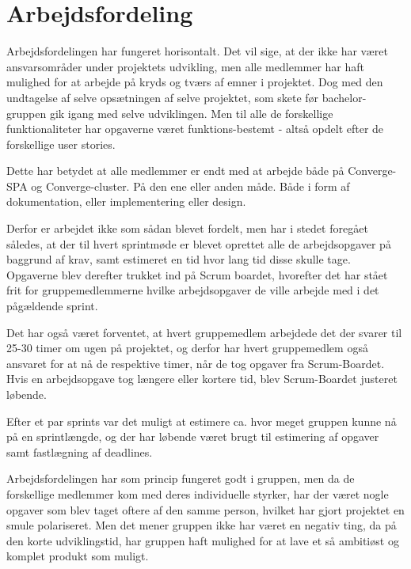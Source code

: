 
\chapter{Arbejdsfordeling}

Arbejdsfordelingen har fungeret horisontalt. Det vil sige, at der ikke har været ansvarsområder under projektets udvikling, men alle medlemmer har haft mulighed for at arbejde på kryds og tværs af emner i projektet. Dog med den undtagelse af selve opsætningen af selve projektet, som skete før bachelor-gruppen gik igang med selve udviklingen. Men til alle de forskellige funktionaliteter  har opgaverne været funktions-bestemt - altså opdelt efter de forskellige user stories.

Dette har betydet at alle medlemmer er endt med at arbejde både på Converge-SPA og Converge-cluster. På den ene eller anden måde. Både i form af dokumentation, eller implementering eller design.

Derfor er arbejdet ikke som sådan blevet fordelt, men har i stedet foregået således, at der til hvert sprintmøde er blevet oprettet alle de arbejdsopgaver på baggrund af krav, samt estimeret en tid hvor lang tid disse skulle tage. Opgaverne blev derefter trukket ind på Scrum boardet, hvorefter det har stået frit for gruppemedlemmerne hvilke arbejdsopgaver de ville arbejde med i det pågældende sprint.

Det har også været forventet, at hvert gruppemedlem arbejdede det der svarer til 25-30 timer om ugen på projektet, og derfor har hvert gruppemedlem også ansvaret for at nå de respektive timer, når de tog opgaver fra Scrum-Boardet. Hvis en arbejdsopgave tog længere eller kortere tid, blev Scrum-Boardet justeret løbende. 

Efter et par sprints var det muligt at estimere ca. hvor meget gruppen kunne nå på en sprintlængde, og der har løbende været brugt til estimering af opgaver samt fastlægning af deadlines.

Arbejdsfordelingen har som princip fungeret godt i gruppen, men da de forskellige medlemmer kom med deres individuelle styrker, har der været nogle opgaver som blev taget oftere af den samme person, hvilket har gjort projektet en smule polariseret. Men det mener gruppen ikke har været en negativ ting, da på den korte udviklingstid, har gruppen haft mulighed for at lave et så ambitiøst og komplet produkt som muligt.